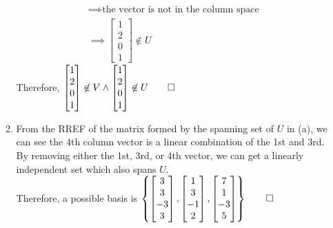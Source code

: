 \documentclass[12pt, a4paper]{article}
\begin{document}
\begin{enumerate}[Q\arabic*.]
\begin{enumerate}[(\alph*)]
\begin{gather*}
          \implies \text{the vector is not in the column space}\\
          \implies  \begin{bmatrix}1\\2\\0\\1\end{bmatrix} \not\in U
        \end{gather*}
        Therefore, $\begin{bmatrix}1\\2\\0\\1\end{bmatrix} \not\in V \land \begin{bmatrix}1\\2\\0\\1\end{bmatrix} \not\in U \qed$

      \item From the RREF of the matrix formed by the spanning set of $U$ in (a), we can see the 4th column vector is a linear combination of the 1st and 3rd. By removing either the 1st, 3rd, or 4th vector, we can get a linearly independent set which also spans $U$.\\Therefore, a possible basis is $\left\{\begin{bmatrix}3\\3\\-3\\3\end{bmatrix}, \begin{bmatrix}1\\3\\-1\\2\end{bmatrix}, \begin{bmatrix}7\\1\\-3\\5\end{bmatrix}\right\} \qed$ 


\end{enumerate}
\end{enumerate}
\end{document}
